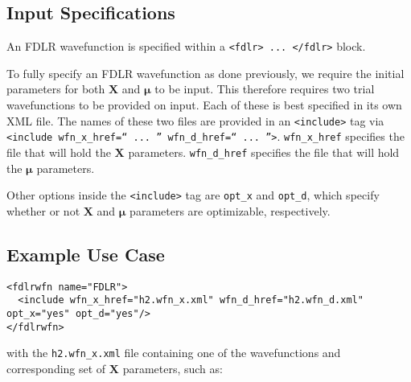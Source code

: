 \subsection{Input Specifications}
An FDLR wavefunction is specified within a \texttt{<fdlr> ... </fdlr>} block.

To fully specify an FDLR wavefunction as done previously, we require the initial parameters for both $\mathbf{X}$ and $\mathbf{\mu}$ to be input. This therefore requires two trial wavefunctions to be provided on input. Each of these is best specified in its own XML file. The names of these two files are provided in an \texttt{<include>} tag via \texttt{<include wfn\_x\_href=`` ... '' wfn\_d\_href=`` ... ''>}. \texttt{wfn\_x\_href} specifies the file that will hold the $\mathbf{X}$ parameters. \texttt{wfn\_d\_href} specifies the file that will hold the $\mathbf{\mu}$ parameters.

Other options inside the \texttt{<include>} tag are \texttt{opt\_x} and \texttt{opt\_d}, which specify whether or not $\mathbf{X}$ and $\mathbf{\mu}$ parameters are optimizable, respectively.

\subsection{Example Use Case}

\begin{lstlisting}[style=QMCPXML]
<fdlrwfn name="FDLR">
  <include wfn_x_href="h2.wfn_x.xml" wfn_d_href="h2.wfn_d.xml" opt_x="yes" opt_d="yes"/>
</fdlrwfn>
\end{lstlisting}

with the \texttt{h2.wfn\_x.xml} file containing one of the wavefunctions and corresponding set of $\mathbf{X}$ parameters, such as:

